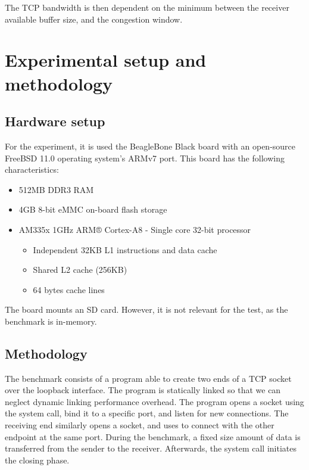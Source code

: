 \documentclass[a4paper,10pt]{article}
\begin{document}
The TCP bandwidth is then dependent on the minimum between the receiver available buffer size, and the congestion window.

\section{Experimental setup and methodology}

\subsection{Hardware setup}

For the experiment, it is used the BeagleBone Black board with an open-source FreeBSD\cite{mckusick_design_2014} 11.0 operating system’s ARMv7 port. This board has the following characteristics:
\begin{itemize}
    \item 512MB DDR3 RAM
    \item 4GB 8-bit eMMC on-board flash storage
    \item AM335x 1GHz ARM® Cortex-A8 - Single core 32-bit processor\cite{noauthor_am3358_nodate}
    \begin{itemize}
        \item Independent 32KB L1 instructions and data cache
        \item Shared L2 cache (256KB)
        \item 64 bytes cache lines
    \end{itemize}
\end{itemize}

The board mounts an SD card. However, it is not relevant for the test, as the benchmark is in-memory.
      

\subsection {Methodology}
The benchmark consists of a program able to create two ends of a TCP socket over the loopback interface. The program is statically linked so that we can neglect dynamic linking performance overhead. The program opens a socket using the  system call, bind it to a specific port, and listen for new connections. The receiving end similarly opens a socket, and uses  to connect with the other endpoint at the same port. During the benchmark, a fixed size amount of data is transferred from the sender to the receiver. Afterwards, the  system call initiates the closing phase.
\end{document}

